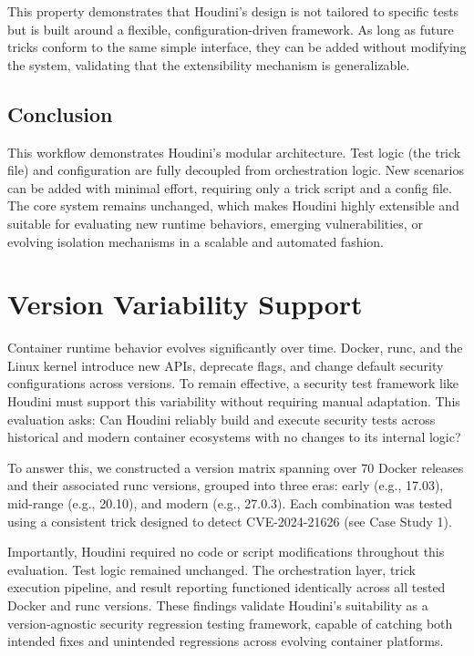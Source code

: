 \documentclass[12pt]{report}
\begin{document}
\begin{doublespace}
This property demonstrates that Houdini’s design is not tailored to specific tests but is built around a flexible, configuration-driven framework. As long as future tricks conform to the same simple interface, they can be added without modifying the system, validating that the extensibility mechanism is generalizable.

\subsection*{Conclusion}

This workflow demonstrates Houdini’s modular architecture. Test logic (the trick file) and configuration are fully decoupled from orchestration logic. New scenarios can be added with minimal effort, requiring only a trick script and a config file. The core system remains unchanged, which makes Houdini highly extensible and suitable for evaluating new runtime behaviors, emerging vulnerabilities, or evolving isolation mechanisms in a scalable and automated fashion.


















\section{Version Variability Support}

Container runtime behavior evolves significantly over time. Docker, runc, and the Linux kernel introduce new APIs, deprecate flags, and change default security configurations across versions. To remain effective, a security test framework like Houdini must support this variability without requiring manual adaptation. This evaluation asks: Can Houdini reliably build and execute security tests across historical and modern container ecosystems with no changes to its internal logic?

To answer this, we constructed a version matrix spanning over 70 Docker releases and their associated runc versions, grouped into three eras: early (e.g., 17.03), mid-range (e.g., 20.10), and modern (e.g., 27.0.3). Each combination was tested using a consistent trick designed to detect CVE-2024-21626 (see Case Study 1).

Importantly, Houdini required no code or script modifications throughout this evaluation. Test logic remained unchanged. The orchestration layer, trick execution pipeline, and result reporting functioned identically across all tested Docker and runc versions. These findings validate Houdini’s suitability as a version-agnostic security regression testing framework, capable of catching both intended fixes and unintended regressions across evolving container platforms.


\end{doublespace}
\end{document}
